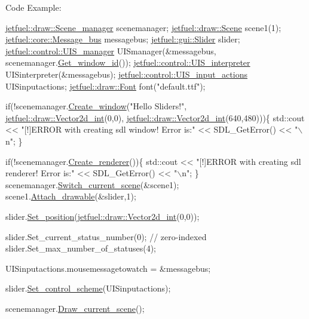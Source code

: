 Code Example\+: 
\begin{DoxyCode}
\hyperlink{classjetfuel_1_1draw_1_1Scene__manager}{jetfuel::draw::Scene\_manager} scenemanager;
\hyperlink{classjetfuel_1_1draw_1_1Scene}{jetfuel::draw::Scene} scene1(1);
\hyperlink{classjetfuel_1_1core_1_1Message__bus}{jetfuel::core::Message\_bus} messagebus;
\hyperlink{classjetfuel_1_1gui_1_1Slider}{jetfuel::gui::Slider} slider;
\hyperlink{classjetfuel_1_1control_1_1UIS__manager}{jetfuel::control::UIS\_manager} UISmanager(&messagebus,
                                  scenemanager.\hyperlink{classjetfuel_1_1draw_1_1Scene__manager_a1758a86d40dcfaface8958fcd33676bf}{Get\_window\_id}());
\hyperlink{classjetfuel_1_1control_1_1UIS__interpreter}{jetfuel::control::UIS\_interpreter} UISinterpreter(&messagebus);
\hyperlink{structjetfuel_1_1control_1_1UIS__input__actions}{jetfuel::control::UIS\_input\_actions} UISinputactions;
\hyperlink{classjetfuel_1_1draw_1_1Font}{jetfuel::draw::Font} font(\textcolor{stringliteral}{"default.ttf"});

\textcolor{keywordflow}{if}(!scenemanager.\hyperlink{classjetfuel_1_1draw_1_1Scene__manager_a5113e9062c272a22d383ba872417ba31}{Create\_window}(\textcolor{stringliteral}{"Hello Sliders!"},
                               \hyperlink{classjetfuel_1_1draw_1_1Vector2d}{jetfuel::draw::Vector2d\_int}(0,0),
                          \hyperlink{classjetfuel_1_1draw_1_1Vector2d}{jetfuel::draw::Vector2d\_int}(640,480)))\{
    std::cout << \textcolor{stringliteral}{"[!]ERROR with creating sdl window! Error is:"}
    << SDL\_GetError() << \textcolor{stringliteral}{"\(\backslash\)n"};
\}

\textcolor{keywordflow}{if}(!scenemanager.\hyperlink{classjetfuel_1_1draw_1_1Scene__manager_afafecd926ce5e4b2543a6d583a7d24b6}{Create\_renderer}())\{
    std::cout << \textcolor{stringliteral}{"[!]ERROR with creating sdl renderer! Error is:"}
    << SDL\_GetError() << \textcolor{stringliteral}{"\(\backslash\)n"};
\}
scenemanager.\hyperlink{classjetfuel_1_1draw_1_1Scene__manager_a770c163b88ba8427539ee182315ea989}{Switch\_current\_scene}(&scene1);
scene1.\hyperlink{classjetfuel_1_1draw_1_1Scene_aea4b4c4ae25c30d661be4c52787e0ea3}{Attach\_drawable}(&slider,1);

slider.\hyperlink{classjetfuel_1_1gui_1_1Slider_a11721a72699e9d1cdd0f6e5709f003e4}{Set\_position}(\hyperlink{classjetfuel_1_1draw_1_1Vector2d}{jetfuel::draw::Vector2d\_int}(0,0));

slider.Set\_current\_status\_number(0); \textcolor{comment}{// zero-indexed}
slider.Set\_max\_number\_of\_statuses(4);

UISinputactions.mousemessagetowatch = &messagebus;

slider.\hyperlink{classjetfuel_1_1gui_1_1Slider_a64531a8ed9353906ffb8e1b5720e9409}{Set\_control\_scheme}(UISinputactions);

scenemanager.\hyperlink{classjetfuel_1_1draw_1_1Scene__manager_a8af9a3abfd5121b1b8556342de435773}{Draw\_current\_scene}();
\end{DoxyCode}
 

